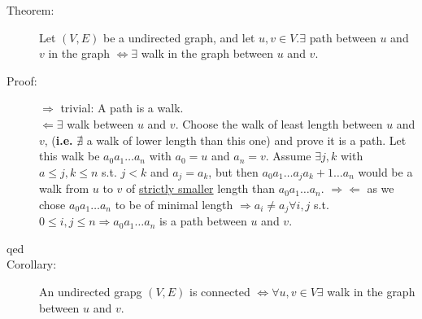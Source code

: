 \documentclass[10pt]{article}
\begin{document}
\begin{description}
\begin{enumerate}
\begin{figure}[h!]
			\end{figure}
		\end{enumerate}
		\item[Theorem:] Let $(V, E)$ be a undirected graph, and let $u, v \in V. \exists$ path between $u$ and $v$ in the graph $\Leftrightarrow \exists$ walk in the graph between $u$ and $v$.
		\item[Proof:] $\Rightarrow$ trivial: A path is a walk. \\
		$\Leftarrow \exists$ walk between $u$ and $v$. Choose the walk of least length between $u$ and $v$, (\textbf{i.e.} $\nexists$ a walk of lower length than this one) and prove it is a path. Let this walk be $a_0 a_1 \dots a_n$ with $a_0 = u$ and $a_n = v$. Assume $\exists j, k$ with $a \leq j, k \leq n$ s.t. $j < k$ and $a_j = a_k$, but then $a_0 a_1 \dots a_j a_k+1 \dots a_n$ would be a walk from $u$ to $v$ of \underline{strictly smaller} length than $a_0 a_1 \dots a_n$. $\Rightarrow \Leftarrow$ as we chose $a_0 a_1 \dots a_n$ to be of minimal length $ \Rightarrow a_i \neq a_j \forall i, j$ s.t. $0 \leq i, j \leq n \Rightarrow a_0 a_1 \dots a_n$ is a path between $u$ and $v$.
		\item[qed]
		\item[Corollary:] An undirected grapg $(V, E)$ is connected $\Leftrightarrow \forall u, v \in V \exists$ walk in the graph between $u$ and $v$.
	\end{description}
	
\end{document}
